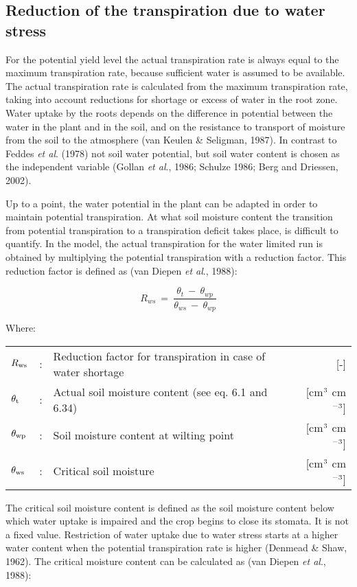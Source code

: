 \subsection{Reduction of the transpiration due to water stress}

For the potential yield level the actual transpiration rate is always equal to the maximum
transpiration rate, because sufficient water is assumed to be available. The actual transpiration rate is
calculated from the maximum transpiration rate, taking into account reductions for
shortage or excess of water in the root zone. Water uptake by the roots depends on the
difference in potential between the water in the plant and in the soil, and on the resistance
to transport of moisture from the soil to the atmosphere (van Keulen \& Seligman, 1987).
In contrast to Feddes {\it et al}. (1978) not soil water potential, but soil water content is
chosen as the independent variable (Gollan {\it et al}., 1986; Schulze 1986; Berg and Driessen, 2002).

Up to a point, the water potential in the plant can be adapted in order to maintain
potential transpiration. At what soil moisture content the transition from potential
transpiration to a transpiration deficit takes place, is difficult to quantify. In the model,
the actual transpiration for the water limited run is obtained by multiplying the potential
transpiration with a reduction factor. This reduction factor is defined as (van Diepen {\it et al}., 1988):

\begin{equation}
\label{eq:6.8}
R_{ws} ~=~{\frac{\theta_{t} ~-~ \theta_{wp} }{ \theta_{ws} ~-~ \theta_{wp}}}
\end{equation}

Where:\\[5pt]
\begin{tabularx}{\textwidth}{llXr}
	$R_{{\rm ws}}$ &:& Reduction factor for transpiration in case of
	water shortage & [-]\\
	$\theta_{{\rm t}}$ &:& Actual soil moisture content (see eq. 6.1 and 
	6.34) & [cm$^{{\rm 3}}$ cm$^{{\rm -3}}$]\\
	$\theta_{{\rm wp}}$ &:& Soil moisture content at wilting 
	point & [cm$^{{\rm 3}}$ cm$^{{\rm -3}}$]\\
	$\theta_{{\rm ws}}$ &:& Critical soil moisture & [cm$^{{\rm 3}}$ cm$^{{\rm -3}}$]\\ 
\end{tabularx}

The critical soil moisture content is defined as the soil moisture content below
which water uptake is impaired and the crop begins to close its stomata. It is not a fixed
value. Restriction of water uptake due to water stress starts at a higher water content
when the potential transpiration rate is higher (Denmead \& Shaw, 1962). The critical
moisture content can be calculated as (van Diepen {\it et al}., 1988):

